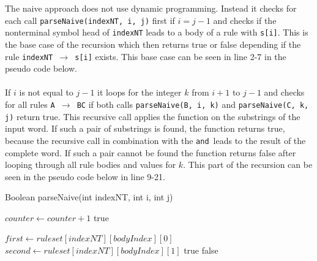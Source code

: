 \documentclass[a4paper, 11pt]{article}
\begin{document}
The naive approach does not use dynamic programming. Instead it checks for each call \texttt{parseNaive(indexNT, i, j)} first if $i = j-1$ and checks if the nonterminal symbol head of \texttt{indexNT} leads to a body of a rule with \texttt{s[i]}. This is the base case of the recursion which then returns true or false depending if the rule \texttt{indexNT $\rightarrow$  s[i]} exists. This base case can be seen in line 2-7 in the pseudo code below.
\\ 
\\
If $i$ is not equal to $j-1$ it loops for the integer $k$ from $i+1$ to $j-1$ and checks for all rules \texttt{A $\rightarrow$ BC} if both calls \texttt{parseNaive(B, i, k)} and \texttt{parseNaive(C, k, j)} return true. This recursive call applies the function on the substrings of the input word. If such a pair of substrings is found, the function returns true, because the recursive call in combination with the \grqq \texttt{and}\grqq \ leads to the result of the complete word. If such a pair cannot be found the function returns false after looping through all rule bodies and values for $k$. This part of the recursion can be seen in the pseudo code below in line 9-21.





\begin{algorithm}[H]
\label{alg_naive}
\caption{Boolean parseNaive(int indexNT, int i, int j)}\label{alg:cap}
\begin{algorithmic}[1]
\State $counter \gets counter+1$
\State \Return true
\EndIf
\EndFor

\Else
{}
\State $first \gets ruleset[indexNT][bodyIndex][0]$
\State $second \gets ruleset[indexNT][bodyIndex][1]$
\State \Return true
\EndIf
\EndFor
\EndIf
\EndFor
\EndIf
\State \Return false
\end{algorithmic}
\end{algorithm}
\end{document}
